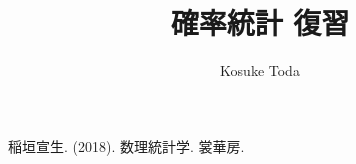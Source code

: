 \documentclass[dvipdfmx]{jsreport}
\title{確率統計 復習}
\author{Kosuke Toda}
\date{}
\begin{document}
\maketitle

\tableofcontents
{}







\begin{thebibliography}{99}
 稲垣宣生. (2018). 数理統計学. 裳華房.
\end{thebibliography}
\end{document}
